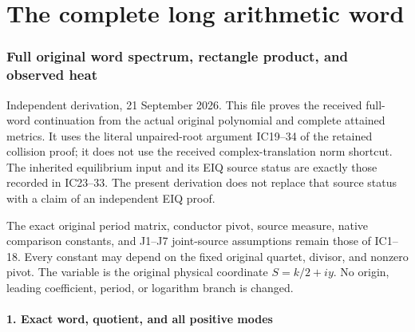 \documentclass[11pt]{article}
\begin{document}
\clearpage\part{The complete long arithmetic word}
\section{Full original word spectrum, rectangle product, and observed heat}\label{full-original-word-spectrum-rectangle-product-and-observed-heat}

Independent derivation, 21 September 2026. This file proves the received full-word continuation from the actual original polynomial and complete attained metrics. It uses the literal unpaired-root argument IC19--34 of the retained collision proof; it does not use the received complex-translation norm shortcut. The inherited equilibrium input and its EIQ source status are exactly those recorded in IC23--33. The present derivation does not replace that source status with a claim of an independent EIQ proof.

The exact original period matrix, conductor pivot, source measure, native comparison constants, and J1--J7 joint-source assumptions remain those of IC1--18. Every constant may depend on the fixed original quartet, divisor, and nonzero pivot. The variable is the original physical coordinate \(S=k/2+iy\). No origin, leading coefficient, period, or logarithm branch is changed.

\subsection{1. Exact word, quotient, and all positive modes}\label{exact-word-quotient-and-all-positive-modes}
\end{document}
